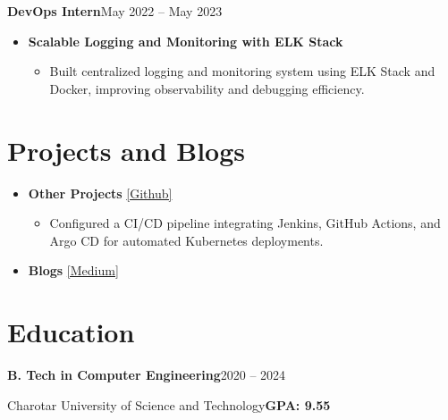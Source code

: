 \documentclass[a4paper,10.999999pt]{article}
\newenvironment{joblong}[2]
        {
        \noindent\textbf{#1}\hfill{#2}\par
        \vspace{0.3pt}
        \begin{minipage}[t]{\linewidth}
        \begin{itemize}[after=\strut, topsep=0.3pt, partopsep=0pt, parsep=0pt, leftmargin=0.5em, itemsep=0.35pt, label=\raisebox{0.2ex}{\tiny$\circ$}]
        }
        {
        \end{itemize}
        \end{minipage}
        \vspace{0.5pt}
        }
\begin{document}
    \begin{joblong}{DevOps Intern}{May 2022 -- May 2023}
    Motorola Solutions
    \item \textbf{Scalable Logging and Monitoring with ELK Stack}
    \begin{itemize}
    \item Built centralized logging and monitoring system using ELK Stack and Docker, improving observability and debugging efficiency.
    \end{itemize}
    \end{joblong}


    \section{Projects and Blogs}

    \begin{itemize}[leftmargin=1.35em, itemsep=0.35pt, topsep=0.3pt, parsep=0pt, label=\raisebox{0.25ex}{\tiny$\circ$}]
    \item \textbf{Other Projects} \href{https://github.com/KelviManavadaria-17}{[Github]}
    \begin{itemize}[nosep, leftmargin=1.5em, itemsep=0.3pt, topsep=0pt, label=\raisebox{0.25ex}{\small$-$}]
    \item Configured a CI/CD pipeline integrating Jenkins, GitHub Actions, and Argo CD for automated Kubernetes deployments.
    \end{itemize}
    \item \textbf{Blogs} \href{https://medium.com/@KelviManavadaria}{[Medium]}
    \end{itemize}


    \section{Education}

    \noindent\textbf{B. Tech in Computer Engineering}\hfill{2020 -- 2024}\par
    \noindent Charotar University of Science and Technology\hfill{\textbf{GPA: 9.55}}\par
\end{document}
